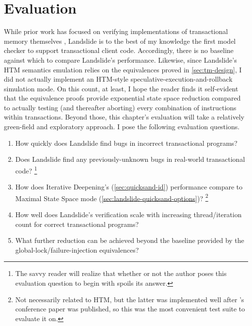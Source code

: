 
\section{Evaluation}
\label{sec:tm-eval}

While prior work has focused on verifying implementations of transactional memory themselves
\cite{specifying-verifying-tm,tm-correctness,tm-completeness,mc-tm-with-spin},
Landslide is to the best of my knowledge the first model checker to support transactional client code.
Accordingly, there is no baseline against which to compare Landslide's performance.
Likewise, since Landslide's HTM semantics emulation relies on the equivalences proved in \cref{sec:tm-design},
I did not actually implement an HTM-style speculative-execution-and-rollback simulation mode.
On this count, at least,
I hope the reader finds it self-evident that
the equivalence proofs provide exponential state space reduction
compared to actually testing (and thereafter aborting) every combination of instructions within transactions.
Beyond those, this chapter's evaluation will take a relatively green-field and exploratory approach.
I pose the following evaluation questions.


\begin{enumerate}
	\item How quickly does Landslide find bugs in incorrect transactional programs? %
	\item Does Landslide find any previously-unknown bugs in real-world transactional code?%
		\footnote{The savvy reader will realize that whether or not the author poses this evaluation question to begin with spoils its answer.}
	\item How does Iterative Deepening's (\cref{sec:quicksand-id})
		performance compare to Maximal State Space mode (\cref{sec:landslide-quicksand-options})?%
		\footnote{Not necessarily related to HTM,
		but the latter was implemented well after 's conference paper was published,
		so this was the most convenient test suite to evaluate it on.}
	\item How well does Landslide's verification scale
		with increasing thread/iteration count for correct transactional programs?
	\item What further reduction can be achieved beyond the baseline provided by
		the global-lock/failure-injection equivalences?
\end{enumerate}

